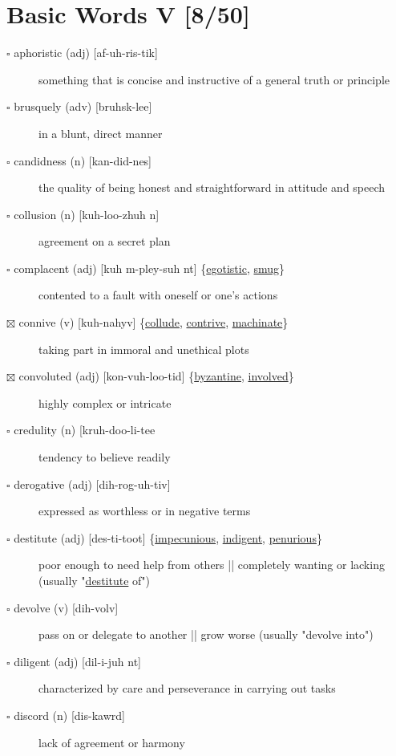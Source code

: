 \documentclass[11pt]{article}
\begin{document}
\section{Basic Words V [8/50]}
\label{sec:orgbd4576d}
\begin{description}
\item[{$\square$ aphoristic (adj) [af-uh-ris-tik]}] something that is concise and instructive of a general truth or principle
\item[{$\square$ brusquely (adv) [bruhsk-lee]}] in a blunt, direct manner
\item[{$\square$ candidness (n) [kan-did-nes]}] the quality of being honest and straightforward in attitude and speech
\item[{$\square$ \label{org361c5c0} \label{orgc4e2eae}collusion (n) [kuh-loo-zhuh n]}] agreement on a secret plan
\item[{$\square$ \label{orgaa8a0db}complacent (adj) [kuh m-pley-suh nt] \{\hyperref[orge21faa1]{egotistic}, \hyperref[org1873ccf]{smug}\}}] contented to a fault with oneself or one's actions
\item[{$\boxtimes$ \label{org035e640}connive (v) [kuh-nahyv] \{\hyperref[org361c5c0]{collude}, \hyperref[org00c2b28]{contrive}, \hyperref[org1de71f4]{machinate}\}}] taking part in immoral and unethical plots
\item[{$\boxtimes$ \label{org2ba5d5b}convoluted (adj) [kon-vuh-loo-tid] \{\hyperref[org15ac659]{byzantine}, \hyperref[org59ec861]{involved}\}}] highly complex or intricate
\item[{$\square$ credulity (n) [kruh-doo-li-tee}] tendency to believe readily
\item[{$\square$ \label{orgbf4ee8a}derogative (adj) [dih-rog-uh-tiv]}] expressed as worthless or in negative terms
\item[{$\square$ \label{orgecdf9e1}destitute (adj) [des-ti-toot] \{\hyperref[org6910be9]{impecunious}, \hyperref[org975d945]{indigent}, \hyperref[orgb268dd4]{penurious}\}}] poor enough to need help from others || completely wanting or lacking (usually "\hyperref[orgecdf9e1]{destitute} of")
\item[{$\square$ devolve (v) [dih-volv]}] pass on or delegate to another || grow worse (usually "devolve into")
\item[{$\square$ diligent (adj) [dil-i-juh nt]}] characterized by care and perseverance in carrying out tasks
\item[{$\square$ \label{org829be41} \label{org96793db}discord (n) [dis-kawrd]}] lack of agreement or harmony

\end{description}
\end{document}
